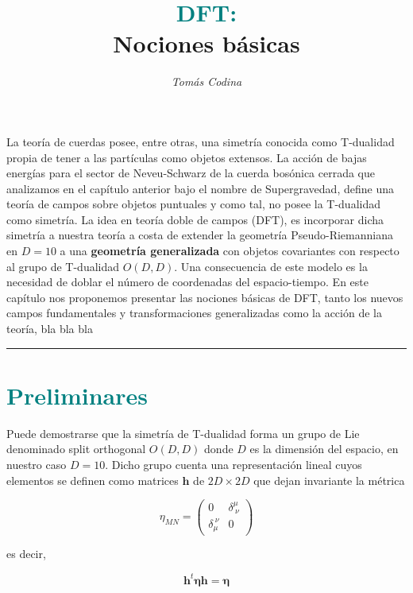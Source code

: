 \documentclass{article}
\title{\vspace{-35pt} \huge{\textbf{\textcolor{teal}{DFT:}}} \\ \vspace{0.1cm} \large{\textbf{Nociones básicas}}}
\date{\vspace{-20pt}}
\author{\textit{Tomás Codina}}
\numberwithin{equation}{section}
\begin{document}
\maketitle
\thispagestyle{fancy}






La teoría de cuerdas posee, entre otras, una simetría conocida como T-dualidad propia de tener a las partículas como objetos extensos. La acción de bajas energías para el sector de Neveu-Schwarz de la cuerda bosónica cerrada que analizamos en el capítulo anterior bajo el nombre de Supergravedad, define una teoría de campos sobre objetos puntuales y como tal, no posee la T-dualidad como simetría. La idea en teoría doble de campos (DFT), es incorporar dicha simetría a nuestra teoría a costa de extender la geometría Pseudo-Riemanniana en $ D=10 $ a una \textbf{geometría generalizada} con objetos covariantes con respecto al grupo de T-dualidad $ O(D,D) $. Una consecuencia de este modelo es la necesidad de doblar el número de coordenadas del espacio-tiempo. En este capítulo nos proponemos presentar las nociones básicas de DFT, tanto los nuevos campos fundamentales y transformaciones generalizadas como la acción de la teoría, bla bla bla
\rule{\textwidth}{0.4pt}

\section{\textcolor{teal}{Preliminares}}\label{sec_preliminares}

Puede demostrarse que la simetría de T-dualidad forma un grupo de Lie denominado split orthogonal $ O(D,D) $ donde $ D $ es la dimensión del espacio, en nuestro caso $ D=10 $. Dicho grupo cuenta una representación lineal cuyos elementos se definen como matrices $ \textbf{h} $ de $ 2D \times 2D $ que dejan invariante la métrica

\begin{equation}\label{key}
\eta_{MN} = \begin{pmatrix}
0 & \delta^{\mu}_{ \ \nu} \\
\delta_{\mu}^{ \ \nu} & 0 
\end{pmatrix}
\end{equation}

es decir,

\begin{equation}\label{key}
\textbf{h}^t \pmb{\eta} \textbf{h} = \pmb{\eta}
\end{equation}
\end{document}
